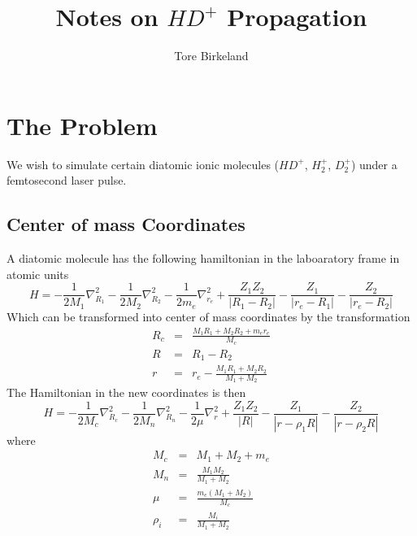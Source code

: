 \documentclass[a4paper]{article}
\title{Notes on $HD^+$ Propagation}
\author{Tore Birkeland}
\begin{document}
\newcommand{\bra}[1]{\<#1|}
\newcommand{\ket}[1]{|#1\>}
\newcommand{\innerproduct}[2]{\<#1|#2\>}
\newcommand{\matrixelement}[3]{\<#1|#2|#3\>}

\maketitle

\section{The Problem}
We wish to simulate certain diatomic ionic molecules ($HD^+$, $H_2^+$, $D_2^+$) under a femtosecond laser pulse. 

\subsection{Center of mass Coordinates}
A diatomic molecule has the following hamiltonian in the laboaratory frame in atomic units
\begin{equation}
 H = - \frac{1}{2 M_1} \nabla^2_{R_1} - \frac{1}{2 M_2} \nabla^2_{R_2} - \frac{1}{2 m_e} \nabla^2_{r_e} + \frac{Z_1 Z_2}{|R_1 - R_2|} - \frac{Z_1}{|r_e - R_1|} - \frac{Z_2}{|r_e - R_2|}
\end{equation}
Which can be transformed into center of mass coordinates by the transformation
\begin{eqnarray}
	R_c &=& \frac{M_1 R_1  + M_2 R_2 + m_e r_e}{M_c} \\
	R &=& R_1 - R_2 \\
	r &=& r_e - \frac{M_1 R_1 + M_2 R_2}{M_1 + M_2}
\end{eqnarray}
The Hamiltonian in the new coordinates is then
\begin{equation}
\label{eqn:full-hamiltonian-cm}
 H = - \frac{1}{2 M_c} \nabla^2_{R_c} - \frac{1}{2 M_n} \nabla^2_{R_n} - \frac{1}{2 \mu} \nabla^2_{r} + \frac{Z_1 Z_2}{|R|} - \frac{Z_1}{|r - \rho_1 R|} - \frac{Z_2}{|r - \rho_2 R|}
\end{equation}
where
\begin{eqnarray*}
 M_c &=& M_1 + M_2 + m_e \\
 M_n &=& \frac{M_1 M_2}{M_1 + M_2} \\
 \mu &=& \frac{m_e(M_1 + M_2)}{M_c} \\
 \rho_i &=& \frac{M_i}{M_1 + M_2} 
\end{eqnarray*}
\end{document}
